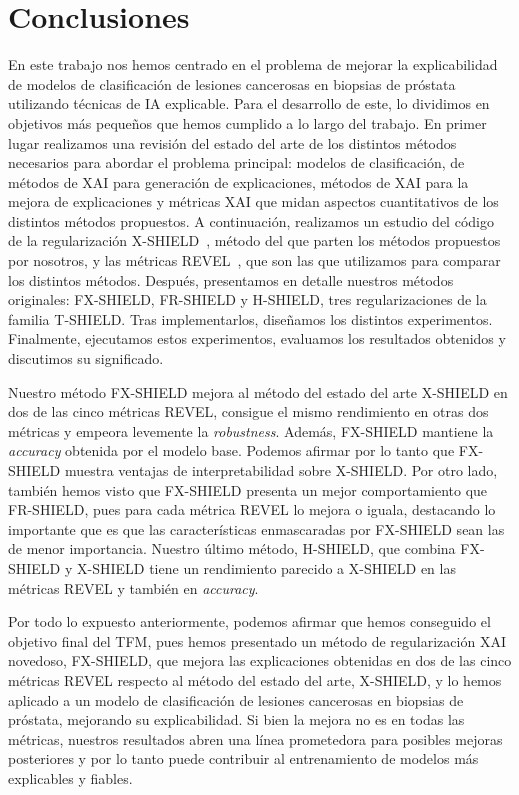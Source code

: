 \clearpage
\chapter{Conclusiones} \label{cap:conc}

En este trabajo nos hemos centrado en el problema de mejorar la explicabilidad de modelos de clasificación de lesiones cancerosas en biopsias de próstata utilizando técnicas de IA explicable. Para el desarrollo de este, lo dividimos en objetivos más pequeños que hemos cumplido a lo largo del trabajo. En primer lugar realizamos una revisión del estado del arte de los distintos métodos necesarios para abordar el problema principal: modelos de clasificación, de métodos de XAI para generación de explicaciones, métodos de XAI para la mejora de explicaciones y métricas XAI que midan aspectos cuantitativos de los distintos métodos propuestos. A continuación, realizamos un estudio del código de la regularización X-SHIELD~\cite{XSHIELD}, método del que parten los métodos propuestos por nosotros, y las métricas REVEL~\cite{REVEL}, que son las que utilizamos para comparar los distintos métodos. Después, presentamos en detalle nuestros métodos originales: FX-SHIELD, FR-SHIELD y H-SHIELD, tres regularizaciones de la familia T-SHIELD. Tras implementarlos, diseñamos los distintos experimentos. Finalmente, ejecutamos estos experimentos, evaluamos los resultados obtenidos y discutimos su significado.


Nuestro método FX-SHIELD mejora al método del estado del arte X-SHIELD en dos de las cinco métricas REVEL, consigue el mismo rendimiento en otras dos métricas y empeora levemente la \textit{robustness}. Además, FX-SHIELD mantiene la \textit{accuracy} obtenida por el modelo base. Podemos afirmar por lo tanto que FX-SHIELD muestra ventajas de interpretabilidad sobre X-SHIELD. Por otro lado, también hemos visto que FX-SHIELD presenta un mejor comportamiento que FR-SHIELD, pues para cada métrica REVEL lo mejora o iguala, destacando lo importante que es que las características enmascaradas por FX-SHIELD sean las de menor importancia. Nuestro último método, H-SHIELD, que combina FX-SHIELD y X-SHIELD tiene un rendimiento parecido a X-SHIELD en las métricas REVEL y también en \textit{accuracy}. 

Por todo lo expuesto anteriormente, podemos afirmar que hemos conseguido el objetivo final del TFM, pues hemos presentado un método de regularización XAI novedoso, FX-SHIELD, que mejora las explicaciones obtenidas en dos de las cinco métricas REVEL respecto al método del estado del arte, X-SHIELD, y lo hemos aplicado a un modelo de clasificación de lesiones cancerosas en biopsias de próstata, mejorando su explicabilidad. Si bien la mejora no es en todas las métricas, nuestros resultados abren una línea prometedora para posibles mejoras posteriores y por lo tanto puede contribuir al entrenamiento de modelos más explicables y fiables.

